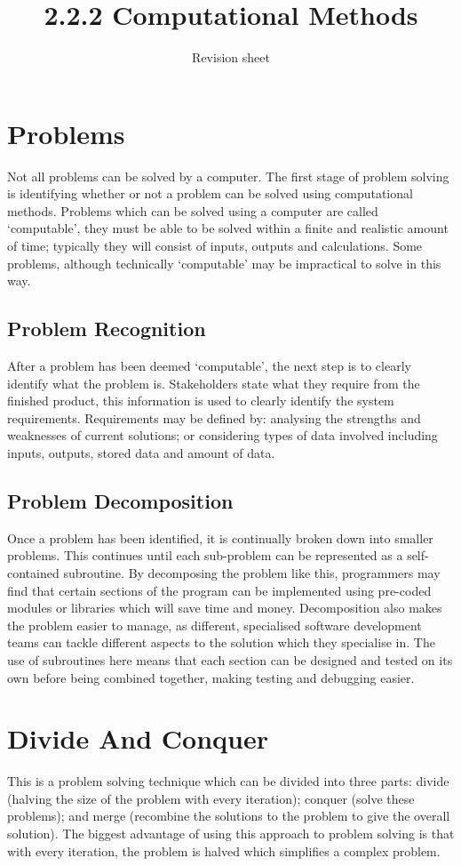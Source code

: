\documentclass[a4paper,11pt, twocolumn]{article}
\title{2.2.2 Computational Methods}
\author{Revision sheet}
\date{}
\begin{document}
\maketitle
\thispagestyle{fancy}

\section{Problems}
Not all problems can be solved by a computer. The first stage of problem solving is identifying whether or not a problem can be solved using computational methods. Problems which can be solved using a computer are called `computable', they must be able to be solved within a finite and realistic amount of time; typically they will consist of inputs, outputs and calculations. Some problems, although technically `computable' may be impractical to solve in this way. 
\subsection{Problem Recognition}
After a problem has been deemed `computable', the next step is to clearly identify what the problem is. Stakeholders state what they require from the finished product, this information is used to clearly identify the system requirements. Requirements may be defined by: analysing the strengths and weaknesses of current solutions; or considering types of data involved including inputs, outputs, stored data and amount of data.
\subsection{Problem Decomposition}
Once a problem has been identified, it is continually broken down into smaller problems. This continues until each sub-problem can be represented as a self-contained subroutine. By decomposing the problem like this, programmers may find that certain sections of the program can be implemented using pre-coded modules or libraries which will save time and money. Decomposition also makes the problem easier to manage, as different, specialised software development teams can tackle different aspects to the solution which they specialise in. The use of subroutines here means that each section can be designed and tested on its own before being combined together, making testing and debugging easier. 

\section{Divide And Conquer}
This is a problem solving technique which can be divided into three parts: divide (halving the size of the problem with every iteration); conquer (solve these problems); and merge (recombine the solutions to the problem to give the overall solution). The biggest advantage of using this approach to problem solving is that with every iteration, the problem is halved which simplifies a complex problem.
\end{document}
